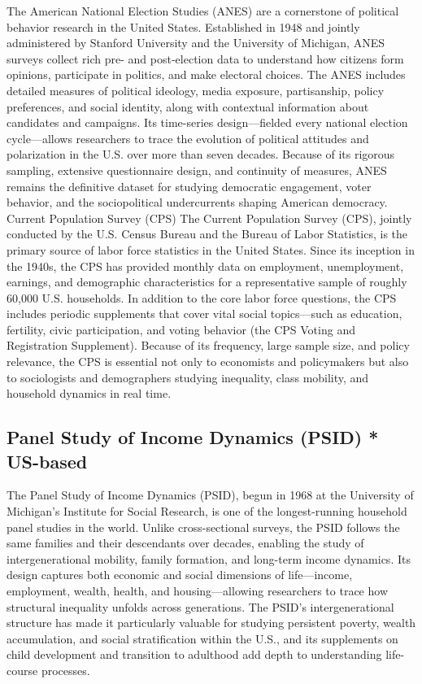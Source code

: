 \documentclass[
  letterpaper,
  DIV=11,
  numbers=noendperiod]{scrreprt}
\begin{document}
The American National Election Studies (ANES) are a cornerstone of
political behavior research in the United States. Established in 1948
and jointly administered by Stanford University and the University of
Michigan, ANES surveys collect rich pre- and post-election data to
understand how citizens form opinions, participate in politics, and make
electoral choices. The ANES includes detailed measures of political
ideology, media exposure, partisanship, policy preferences, and social
identity, along with contextual information about candidates and
campaigns. Its time-series design---fielded every national election
cycle---allows researchers to trace the evolution of political attitudes
and polarization in the U.S. over more than seven decades. Because of
its rigorous sampling, extensive questionnaire design, and continuity of
measures, ANES remains the definitive dataset for studying democratic
engagement, voter behavior, and the sociopolitical undercurrents shaping
American democracy. Current Population Survey (CPS) The Current
Population Survey (CPS), jointly conducted by the U.S. Census Bureau and
the Bureau of Labor Statistics, is the primary source of labor force
statistics in the United States. Since its inception in the 1940s, the
CPS has provided monthly data on employment, unemployment, earnings, and
demographic characteristics for a representative sample of roughly
60,000 U.S. households. In addition to the core labor force questions,
the CPS includes periodic supplements that cover vital social
topics---such as education, fertility, civic participation, and voting
behavior (the CPS Voting and Registration Supplement). Because of its
frequency, large sample size, and policy relevance, the CPS is essential
not only to economists and policymakers but also to sociologists and
demographers studying inequality, class mobility, and household dynamics
in real time.

\subsection{Panel Study of Income Dynamics (PSID) *
US-based}\label{panel-study-of-income-dynamics-psid-us-based}

The Panel Study of Income Dynamics (PSID), begun in 1968 at the
University of Michigan's Institute for Social Research, is one of the
longest-running household panel studies in the world. Unlike
cross-sectional surveys, the PSID follows the same families and their
descendants over decades, enabling the study of intergenerational
mobility, family formation, and long-term income dynamics. Its design
captures both economic and social dimensions of life---income,
employment, wealth, health, and housing---allowing researchers to trace
how structural inequality unfolds across generations. The PSID's
intergenerational structure has made it particularly valuable for
studying persistent poverty, wealth accumulation, and social
stratification within the U.S., and its supplements on child development
and transition to adulthood add depth to understanding life-course
processes.
\end{document}
